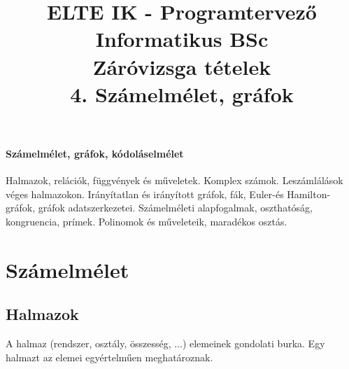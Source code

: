 \documentclass[margin=0px]{article}
\title{\textbf{{\Large ELTE IK - Programtervező Informatikus BSc} \vspace{0.2cm} \\ {\huge Záróvizsga tételek}} \vspace{0.3cm} \\ 4. Számelmélet, gráfok}
\author{}
\date{}
\newenvironment{tetel}[1]{\paragraph{#1 \\}}{}
\begin{document}
\maketitle

\begin{tetel}{Számelmélet, gráfok, kódoláselmélet}
    Halmazok, relációk, függvények és műveletek. Komplex számok. Leszámlálások véges halmazokon. Irányítatlan és irányított gráfok, fák, Euler-és Hamilton-gráfok, gráfok adatszerkezetei. Számelméleti alapfogalmak, oszthatóság, kongruencia, prímek. Polinomok és műveleteik, maradékos osztás.
\end{tetel}
\section{Számelmélet}
\subsection{Halmazok}
A halmaz (rendszer, osztály, összesség, ...) elemeinek gondolati burka. Egy halmazt az elemei egyértelműen meghatároznak.
\end{document}
